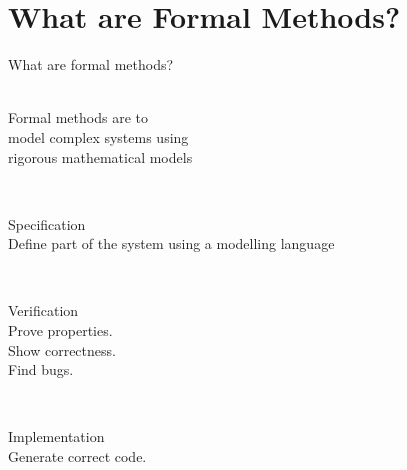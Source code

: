 \documentclass[aspectratio=169]{beamer}
\begin{document}
\frame[plain]{\titlepage}






\section{What are Formal Methods?}


\begin{slide}{What are formal methods?}
  \centering

  \begin{minipage}{0.7\textwidth}
  \Large
  
  \begin{block}{}~\\[-1mm]
    \centering
    Formal methods are  to
    \\
    model \alert{complex systems} using
    \\
    \alert{rigorous mathematical models}

  \end{block}
  \end{minipage}
  \\[7mm]

  \begin{minipage}{0.32\textwidth}
  \begin{alertblock}{Specification}~\\[-1mm]
    Define part of the system using a modelling language
  \end{alertblock}
  \end{minipage}
~~
  \begin{minipage}{0.3\textwidth}
  \begin{alertblock}{Verification}~\\[-1mm]
    Prove properties.\\Show correctness.\\Find bugs.
  \end{alertblock}
  \end{minipage}
~~
  \begin{minipage}{0.28\textwidth}
  \begin{exampleblock}{Implementation}~\\[-1mm]
    Generate correct code.\\~\\~
  \end{exampleblock}
  \end{minipage}

\end{slide}
\end{document}
